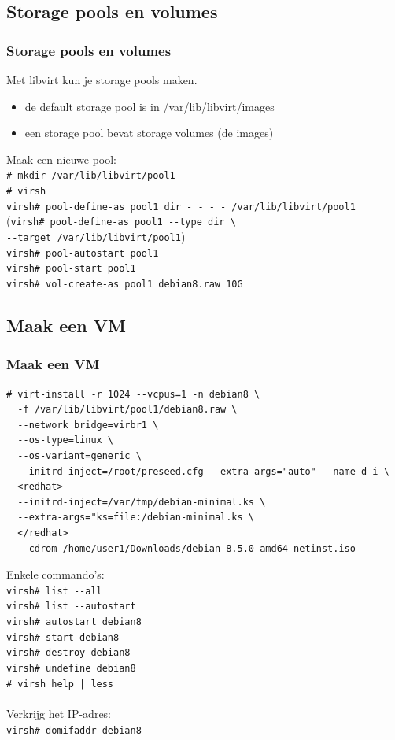 \subsection{Storage pools en volumes}
\begin{styleframefrag}
    \frametitle{Storage pools en volumes}
Met libvirt kun je storage pools maken.
\pause
\begin{itemize}
	\item de default storage pool is in /var/lib/libvirt/images
	\pause
	\item een storage pool bevat storage volumes (de images)
	\pause
\end{itemize}
Maak een nieuwe pool:\\
\scriptsize
\verb!# mkdir /var/lib/libvirt/pool1!\\
\pause
\verb!# virsh!\\
\pause
\verb!virsh# pool-define-as pool1 dir - - - - /var/lib/libvirt/pool1!\\
\pause
(\verb!virsh# pool-define-as pool1 --type dir \!
\verb!                             --target /var/lib/libvirt/pool1!)\\
\pause
\verb!virsh# pool-autostart pool1!\\
\pause
\verb!virsh# pool-start pool1!\\
\pause
\verb!virsh# vol-create-as pool1 debian8.raw 10G!
\end{styleframefrag}

\subsection {Maak een VM}
\begin{styleframefrag}
    \frametitle{Maak een VM}
\scriptsize
\begin{verbatim}
# virt-install -r 1024 --vcpus=1 -n debian8 \
  -f /var/lib/libvirt/pool1/debian8.raw \
  --network bridge=virbr1 \
  --os-type=linux \
  --os-variant=generic \
  --initrd-inject=/root/preseed.cfg --extra-args="auto" --name d-i \
  <redhat>
  --initrd-inject=/var/tmp/debian-minimal.ks \
  --extra-args="ks=file:/debian-minimal.ks \
  </redhat>
  --cdrom /home/user1/Downloads/debian-8.5.0-amd64-netinst.iso
\end{verbatim}
\pause
Enkele commando's:\\
\verb!virsh# list --all!\\
\pause
\verb!virsh# list --autostart!\\
\pause
\verb!virsh# autostart debian8!\\
\pause
\verb!virsh# start debian8!\\
\pause
\verb!virsh# destroy debian8!\\
\pause
\verb!virsh# undefine debian8!\\
\pause
\verb!# virsh help | less!\\
\pause
~\\
Verkrijg het IP-adres:\\
\verb!virsh# domifaddr debian8!
\end{styleframefrag}

